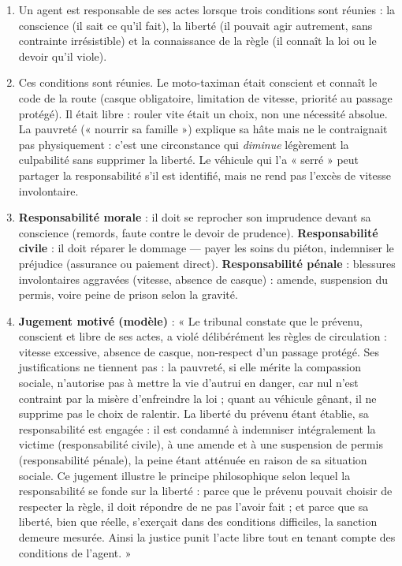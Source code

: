 \documentclass[11pt]{article}
\newcommand{\cle}[1]{{\popxbold\color{popdark}#1}}
\begin{document}
\begin{corrige}
\begin{enumerate}
\item Un agent est responsable de ses actes lorsque trois conditions sont réunies : la \cle{conscience} (il sait ce qu'il fait), la \cle{liberté} (il pouvait agir autrement, sans contrainte irrésistible) et la \cle{connaissance de la règle} (il connaît la loi ou le devoir qu'il viole).
\item Ces conditions sont réunies. Le moto-taximan était conscient et connaît le code de la route (casque obligatoire, limitation de vitesse, priorité au passage protégé). Il était libre : rouler vite était un choix, non une nécessité absolue. La pauvreté (« nourrir sa famille ») explique sa hâte mais ne le contraignait pas physiquement : c'est une circonstance qui \emph{diminue} légèrement la culpabilité sans supprimer la liberté. Le véhicule qui l'a « serré » peut partager la responsabilité s'il est identifié, mais ne rend pas l'excès de vitesse involontaire.
\item \textbf{Responsabilité morale} : il doit se reprocher son imprudence devant sa conscience (remords, faute contre le devoir de prudence). \textbf{Responsabilité civile} : il doit réparer le dommage — payer les soins du piéton, indemniser le préjudice (assurance ou paiement direct). \textbf{Responsabilité pénale} : blessures involontaires aggravées (vitesse, absence de casque) : amende, suspension du permis, voire peine de prison selon la gravité.
\item \textbf{Jugement motivé (modèle)} : « Le tribunal constate que le prévenu, conscient et libre de ses actes, a violé délibérément les règles de circulation : vitesse excessive, absence de casque, non-respect d'un passage protégé. Ses justifications ne tiennent pas : la pauvreté, si elle mérite la compassion sociale, n'autorise pas à mettre la vie d'autrui en danger, car nul n'est contraint par la misère d'enfreindre la loi ; quant au véhicule gênant, il ne supprime pas le choix de ralentir. La liberté du prévenu étant établie, sa responsabilité est engagée : il est condamné à indemniser intégralement la victime (responsabilité civile), à une amende et à une suspension de permis (responsabilité pénale), la peine étant atténuée en raison de sa situation sociale. Ce jugement illustre le principe philosophique selon lequel la responsabilité se fonde sur la liberté : parce que le prévenu pouvait choisir de respecter la règle, il doit répondre de ne pas l'avoir fait ; et parce que sa liberté, bien que réelle, s'exerçait dans des conditions difficiles, la sanction demeure mesurée. Ainsi la justice punit l'acte libre tout en tenant compte des conditions de l'agent. »

\end{enumerate}
\end{corrige}
\end{document}
